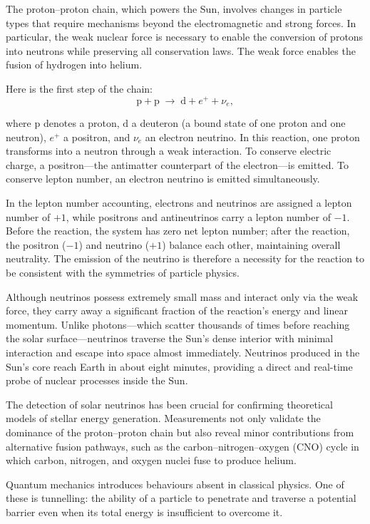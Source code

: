 The proton–proton chain, which powers the Sun, involves changes in particle types that require mechanisms beyond the electromagnetic and strong forces. In particular, the weak nuclear force is necessary to enable the conversion of protons into neutrons while preserving all conservation laws. The weak force enables the fusion of hydrogen into helium.

Here is the first step of the chain:
\[
\text{p} + \text{p} \;\to\; \text{d} + e^+ + \nu_e,
\]

where $\text{p}$ denotes a proton, $\text{d}$ a deuteron (a bound state of one proton and one neutron), $e^+$ a positron, and $\nu_e$ an electron neutrino. In this reaction, one proton transforms into a neutron through a weak interaction. To conserve electric charge, a positron—the antimatter counterpart of the electron—is emitted. To conserve lepton number, an electron neutrino is emitted simultaneously. 

In the lepton number accounting, electrons and neutrinos are assigned a lepton number of $+1$, while positrons and antineutrinos carry a lepton number of $-1$. Before the reaction, the system has zero net lepton number; after the reaction, the positron ($-1$) and neutrino ($+1$) balance each other, maintaining overall neutrality. The emission of the neutrino is therefore a necessity for the reaction to be consistent with the symmetries of particle physics.

Although neutrinos possess extremely small mass and interact only via the weak force, they carry away a significant fraction of the reaction's energy and linear momentum. Unlike photons—which scatter thousands of times before reaching the solar surface—neutrinos traverse the Sun's dense interior with minimal interaction and escape into space almost immediately. Neutrinos produced in the Sun's core reach Earth in about eight minutes, providing a direct and real-time probe of nuclear processes inside the Sun.

The detection of solar neutrinos has been crucial for confirming theoretical models of stellar energy generation. Measurements not only validate the dominance of the proton–proton chain but also reveal minor contributions from alternative fusion pathways, such as the carbon–nitrogen–oxygen (CNO) cycle in which carbon, nitrogen, and oxygen nuclei fuse to produce helium.

Quantum mechanics introduces behaviours absent in classical physics. One of these is tunnelling: the ability of a particle to penetrate and traverse a potential barrier even when its total energy is insufficient to overcome it. 

